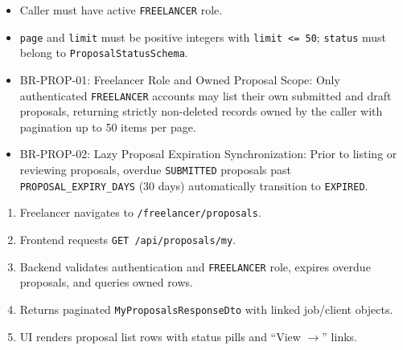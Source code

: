 \begin{itemize}[leftmargin=1.6em,topsep=3pt,itemsep=2pt,parsep=0pt,label=$\bullet$]
    \item Caller must have active \texttt{FREELANCER} role.
    \item \texttt{page} and \texttt{limit} must be positive integers with \texttt{limit <= 50}; \texttt{status} must belong to \texttt{ProposalStatusSchema}.
\end{itemize}

\begin{itemize}[leftmargin=1.6em,topsep=3pt,itemsep=2pt,parsep=0pt,label=$\bullet$]\brrulelist
    \item BR-PROP-01: Freelancer Role and Owned Proposal Scope: Only authenticated \texttt{FREELANCER} accounts may list their own submitted and draft proposals, returning strictly non-deleted records owned by the caller with pagination up to 50 items per page.
    \item BR-PROP-02: Lazy Proposal Expiration Synchronization: Prior to listing or reviewing proposals, overdue \texttt{SUBMITTED} proposals past \texttt{PROPOSAL\_EXPIRY\_DAYS} (30 days) automatically transition to \texttt{EXPIRED}.
\end{itemize}

\begin{enumerate}[leftmargin=1.8em,topsep=3pt,itemsep=2pt,parsep=0pt]
    \item Freelancer navigates to \texttt{/freelancer/proposals}.
    \item Frontend requests \texttt{GET /api/proposals/my}.
    \item Backend validates authentication and \texttt{FREELANCER} role, expires overdue proposals, and queries owned rows.
    \item Returns paginated \texttt{MyProposalsResponseDto} with linked job/client objects.
    \item UI renders proposal list rows with status pills and ``View $\rightarrow$'' links.
\end{enumerate}

